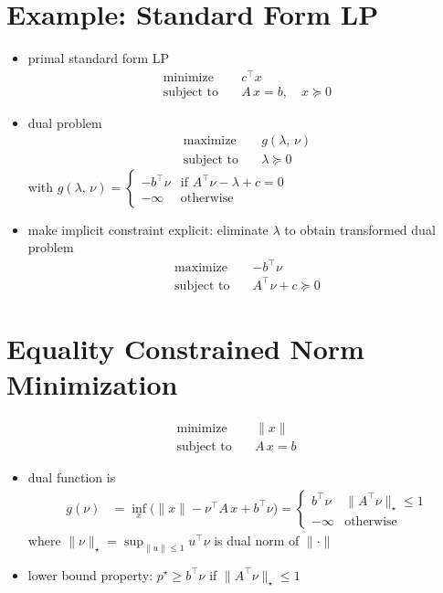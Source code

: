 \documentclass[11pt]{extarticle}
\newcommand{\ds}{\displaystyle}
\theoremstyle{definition}
\begin{document}
\newpage

\section*{Example: Standard Form LP}
\begin{itemize}
  \item primal standard form LP
    \begin{align*}
      \text{minimize}\quad & c^\top x \\
      \text{subject to}\quad & A\,x = b,\quad x\succcurlyeq 0 
    \end{align*}
  \item dual problem 
    \begin{align*}
      \text{maximize}\quad & g(\lambda,\,\nu) \\
      \text{subject to}\quad & \lambda\succcurlyeq 0 
    \end{align*}
    with $\ds g(\lambda,\,\nu) = \begin{cases} -b^\top\nu & \text{if } A^\top\nu - \lambda + c = 0 \\ -\infty & \text{otherwise} \end{cases}$
  \item make implicit constraint explicit: eliminate $\lambda$ to obtain transformed dual problem
    \begin{align*}
      \text{maximize}\quad & -b^\top\nu \\
      \text{subject to}\quad & A^\top\nu + c \succcurlyeq 0 
    \end{align*}
\end{itemize}

\newpage

\section*{Equality Constrained Norm Minimization}
\begin{align*}
  \text{minimize}\quad & \|x\| \\
  \text{subject to}\quad & A\,x = b 
\end{align*}
\begin{itemize}%
  \item dual function is \\
    \begin{align*}
      g(\nu) &= \inf_x \big(\|x\| - \nu^\top A\,x + b^\top\nu\big) = \begin{cases} b^\top\nu & \|A^\top\nu\|_\star\leqslant 1 \\ -\infty & \text{otherwise} \end{cases}
    \end{align*}
    where $\ds\|\nu\|_\star = \sup_{\|u\|\leqslant 1}u^\top\nu$ is dual norm of $\|\cdot\|$
  \item lower bound property: $p^\star\geqslant b^\top\nu$ if $\ds\|A^\top\nu\|_\star\leqslant 1$
\end{itemize}
\end{document}
